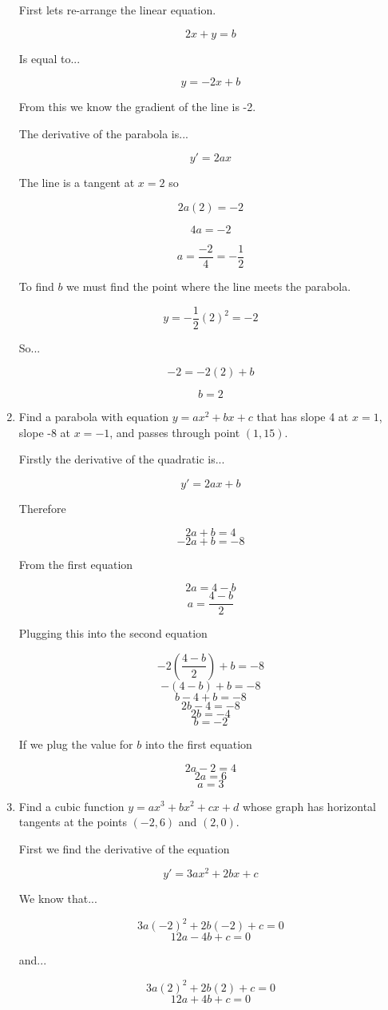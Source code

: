 \documentclass{article}
\begin{document}
\begin{enumerate}
				First lets re-arrange the linear equation.

				$$2x + y = b$$

				Is equal to...

				$$y = -2x + b$$

				From this we know the gradient of the line is -2.

				The derivative of the parabola is...

				$$y' = 2ax$$

				The line is a tangent at $x = 2$ so

				$$2a(2) = -2$$

				$$4a = -2$$

				$$a = \frac{-2}{4} = -\frac{1}{2}$$

				To find $b$ we must find the point where the line meets the
				parabola.

				$$y = -\frac{1}{2}(2)^2 = -2$$

				So...

				$$-2 = -2(2) + b$$

				$$b = 2$$

			\item Find a parabola with equation $y = ax^2 + bx + c$ that has slope 4
				at $x = 1$, slope -8 at $x = -1$, and passes through point $(1,15)$.

				Firstly the derivative of the quadratic is...

				$$y' = 2ax + b$$

				Therefore

				$$2a + b = 4$$
				$$-2a + b = -8$$

				From the first equation

				$$2a = 4 - b$$
				$$a = \frac{4-b}{2}$$

				Plugging this into the second equation

				$$-2(\frac{4-b}{2}) + b = -8$$
				$$-(4-b) + b = -8$$
				$$b-4+b = -8$$
				$$2b - 4 = - 8$$
				$$2b = -4$$
				$$b = -2$$

				If we plug the value for $b$ into the first equation

				$$2a -2 = 4$$
				$$2a = 6$$
				$$a = 3$$

			\item Find a cubic function $y = ax^3 + bx^2 + cx + d$ whose graph has horizontal
				tangents at the points $(-2,6)$ and $(2,0)$.

				First we find the derivative of the equation

				$$y' = 3ax^2 + 2bx + c$$

				We know that...

				$$3a(-2)^2 + 2b(-2) + c = 0$$
				$$12a -4b + c = 0$$

				and...

				$$3a(2)^2 + 2b(2) + c = 0$$
				$$12a + 4b + c = 0$$

 
	\end{enumerate}	
\end{document}
